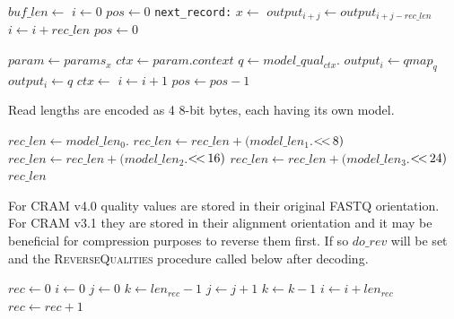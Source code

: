 \documentclass[a4paper]{article}
\begin{document}
\begin{algorithmic}[1]
  \State $buf\_len \gets$ 
  \State {}
  \State {}
  \State $i \gets 0$
  \State $pos \gets 0$
  \Label \texttt{next\_record:}
      \State $x \gets $
          \State $output_{i+j} \gets output_{i+j-rec\_len}$
        \EndFor
        \State $i \gets i+rec\_len$
        \State $pos \gets 0$
        \State {}
      \EndIf

      \Statex
      \State $param \gets params_x$
      \State $ctx \gets param.context$
    \EndIf
    \Statex
    \State $q \gets model\_qual_{ctx}.$
      \State $output_i \gets qmap_q$
    \Else
      \State $output_i \gets q$
    \EndIf
    \Statex
    \State $ctx \gets $
    \Statex
    \State $i \gets i + 1$
    \State $pos \gets pos - 1$
  \EndWhile
    \State {}
  \EndIf
\EndProcedure
\end{algorithmic}

Read lengths are encoded as 4 8-bit bytes, each having its own model.

\begin{algorithmic}[1]
\Statex
{}
\State $rec\_len \gets model\_len_0.$
\State $rec\_len \gets rec\_len + (model\_len_1.$$ \mathbin{<\mkern-3mu<\,} 8)$
\State $rec\_len \gets rec\_len + (model\_len_2.$$ \mathbin{<\mkern-3mu<\,} 16)$
\State $rec\_len \gets rec\_len + (model\_len_3.$$ \mathbin{<\mkern-3mu<\,} 24)$
\State \Return $rec\_len$
\EndFunction
\end{algorithmic}

For CRAM v4.0 quality values are stored in their original FASTQ
orientation.  For CRAM v3.1 they are stored in their alignment
orientation and it may be beneficial for compression purposes to
reverse them first.  If so $do\_rev$ will be set and the
\textsc{ReverseQualities} procedure called below after decoding.

\begin{algorithmic}[1]
\Statex
{}
\State $rec \gets 0$
\State $i \gets 0$
    \State $j \gets 0$
    \State $k \gets len_{rec}-1$
      \State {}
      \State $j \gets j+1$
      \State $k \gets k-1$
    \EndWhile
    \State $i \gets i + len_{rec}$
    \State $rec \gets rec+1$
  \EndIf
\EndWhile
\EndProcedure
\end{algorithmic}
\end{document}
